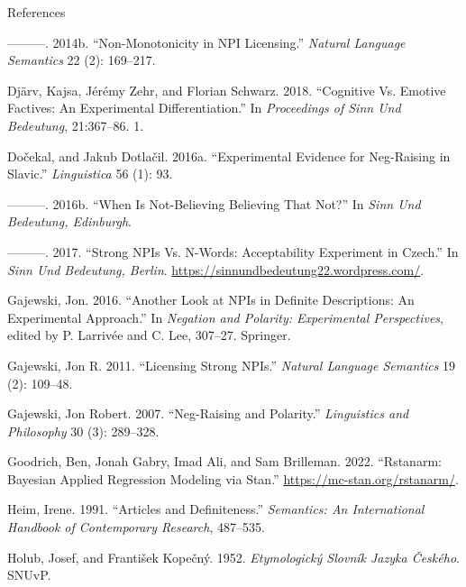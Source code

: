 \documentclass[
  ignorenonframetext,
]{beamer}
\newlength{\cslhangindent}
\newlength{\cslentryspacingunit} %
\newenvironment{CSLReferences}[2] %
 {%
  \setlength{\parindent}{0pt}
  \ifodd #1
  \let\oldpar\par
  \def\par{\hangindent=\cslhangindent\oldpar}
  \fi
  \setlength{\parskip}{#2\cslentryspacingunit}
 }%
 {}
\begin{document}
\begin{frame}{References}
\begin{CSLReferences}{1}{0}
\leavevmode{}%
---------. 2014b. {``Non-Monotonicity in NPI Licensing.''} \emph{Natural
Language Semantics} 22 (2): 169--217.

\leavevmode{}%
Djärv, Kajsa, Jérémy Zehr, and Florian Schwarz. 2018. {``Cognitive Vs.
Emotive Factives: An Experimental Differentiation.''} In
\emph{Proceedings of Sinn Und Bedeutung}, 21:367--86. 1.

\leavevmode{}%
Dočekal, and Jakub Dotlačil. 2016a. {``Experimental Evidence for
Neg-Raising in Slavic.''} \emph{Linguistica} 56 (1): 93.

\leavevmode{}%
---------. 2016b. {``When Is Not-Believing Believing That Not?''} In
\emph{Sinn Und Bedeutung, Edinburgh}.

\leavevmode{}%
---------. 2017. {``Strong NPIs Vs. N-Words: Acceptability Experiment in
Czech.''} In \emph{Sinn Und Bedeutung, Berlin}.
\url{https://sinnundbedeutung22.wordpress.com/}.

\leavevmode{}%
Gajewski, Jon. 2016. {``Another Look at {NPI}s in Definite Descriptions:
An Experimental Approach.''} In \emph{Negation and Polarity:
Experimental Perspectives}, edited by P. Larrivée and C. Lee, 307--27.
Springer.

\leavevmode{}%
Gajewski, Jon R. 2011. {``Licensing Strong NPIs.''} \emph{Natural
Language Semantics} 19 (2): 109--48.

\leavevmode{}%
Gajewski, Jon Robert. 2007. {``Neg-Raising and Polarity.''}
\emph{Linguistics and Philosophy} 30 (3): 289--328.

\leavevmode{}%
Goodrich, Ben, Jonah Gabry, Imad Ali, and Sam Brilleman. 2022.
{``Rstanarm: {Bayesian} Applied Regression Modeling via {Stan}.''}
\url{https://mc-stan.org/rstanarm/}.

\leavevmode{}%
Heim, Irene. 1991. {``Articles and Definiteness.''} \emph{Semantics: An
International Handbook of Contemporary Research}, 487--535.

\leavevmode{}%
Holub, Josef, and František Kopečný. 1952. \emph{Etymologický Slovník
Jazyka Českého}. SNUvP.


\end{CSLReferences}
\end{frame}
\end{document}
